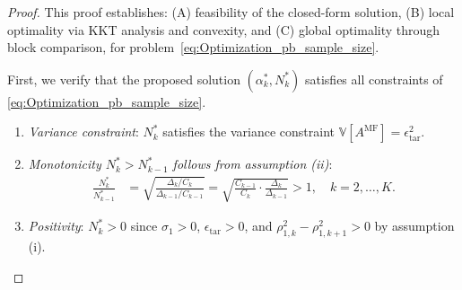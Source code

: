 \begin{proof}
This proof establishes: (A) feasibility of the closed-form solution, (B) local optimality via KKT analysis and convexity, and (C) global optimality through block comparison, for problem~\eqref{eq:Optimization_pb_sample_size}.

\medskip
{}

First, we verify that the proposed solution $(\alpha_k^*, N_k^*)$ satisfies all constraints of \eqref{eq:Optimization_pb_sample_size}.
\begin{enumerate}
    \item \textit{Variance constraint}: $N_k^*$ satisfies the variance constraint $\mathbb{V}[A^{\text{MF}}] = \epsilon_{\text{tar}}^2$.
    
    \item \textit{Monotonicity $N_k^* > N_{k-1}^*$ follows from assumption (ii)}:
    \begin{align*}
    \frac{N_k^*}{N_{k-1}^*} &= \sqrt{ \frac{\Delta_k/C_k}{\Delta_{k-1}/C_{k-1}} } = \sqrt{ \frac{C_{k-1}}{C_k} \cdot \frac{\Delta_k}{\Delta_{k-1}}} > 1,\quad k=2,\ldots,K.
    \end{align*}
    
    \item \textit{Positivity}: $N_k^* > 0$ since $\sigma_1 > 0$, $\epsilon_{\text{tar}} > 0$, and $\rho_{1,k}^2 - \rho_{1,k+1}^2 > 0$ by assumption (i).
\end{enumerate}

\medskip
{}


\end{proof}
